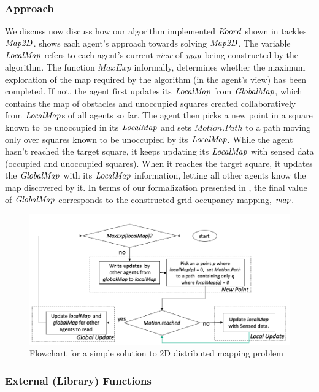 \subsubsection{Approach}
We discuss now discuss how our algorithm implemented $K\kern-2pt oord$ shown in  tackles $\mathit{Map2D}$.  shows each agent's approach towards solving $\mathit{Map2D}$. The variable $\mathit{LocalMap}$ refers to each agent's current \emph{view} of $\mathit{map}$ being constructed by the algorithm. The function $\mathit{MaxExp}$ informally, determines whether the maximum exploration of the map required by the algorithm (in the agent's view) has been completed. If not, the agent first updates its $\mathit{LocalMap}$ from $\mathit{GlobalMap}$, which contains the map of obstacles and unoccupied squares created collaboratively from $\mathit{LocalMap}$s of all agents so far. The agent then picks a new point in a square known to be unoccupied in its $\mathit{LocalMap}$ and sets $\mathit{Motion.Path}$ to a path moving only over squares known to be unoccupied by its $\mathit{LocalMap}$. While the agent hasn't reached the target square, it keeps updating its $\mathit{LocalMap}$ with sensed data (occupied and unoccupied squares). When it reaches the target square, it updates the $\mathit{GlobalMap}$ with its $\mathit{LocalMap}$ information, letting all other agents know the map discovered by it. In terms of our formalization presented in , the final value of $\mathit{GlobalMap}$ corresponds to the constructed grid occupancy mapping, $\mathit{map}$. 
\begin{figure}[!htbp]
    \centering
    \includegraphics[width=\linewidth]{figs/map_flowchart.png}
    \caption{Flowchart for a simple solution to 2D distributed mapping problem\vspace{-2mm}}
    \label{fig:flowmap}
\end{figure}

\subsubsection{External (Library) Functions}


